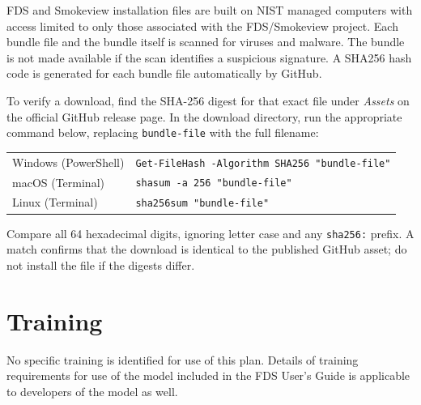 \documentclass[11pt]{book}
\begin{document}
FDS and Smokeview installation files are built on NIST managed computers with access limited to only those associated with the FDS/Smokeview project. Each bundle file and the bundle itself is scanned for viruses and malware. The bundle is not made available if the scan identifies a suspicious signature. A SHA256 hash code is generated for each bundle file automatically by GitHub.

To verify a download, find the SHA-256 digest for that exact file under \emph{Assets} on the official GitHub release page. In the download directory, run the appropriate command below, replacing \texttt{bundle-file} with the full filename:
\begin{center}
\begin{tabular}{ll}
Windows (PowerShell) & \verb|Get-FileHash -Algorithm SHA256 "bundle-file"| \\
macOS (Terminal) & \verb|shasum -a 256 "bundle-file"| \\
Linux (Terminal) & \verb|sha256sum "bundle-file"| \\
\end{tabular}
\end{center}
Compare all 64 hexadecimal digits, ignoring letter case and any \texttt{sha256:} prefix. A match confirms that the download is identical to the published GitHub asset; do not install the file if the digests differ.

\section{Training}

No specific training is identified for use of this plan.  Details of training requirements for use of the model included in the FDS User's Guide is applicable to developers of the model as well.




\backmatter
\nopart

\printbibliography[heading=bibintoc,title={References}]

\printindex
\end{document}
